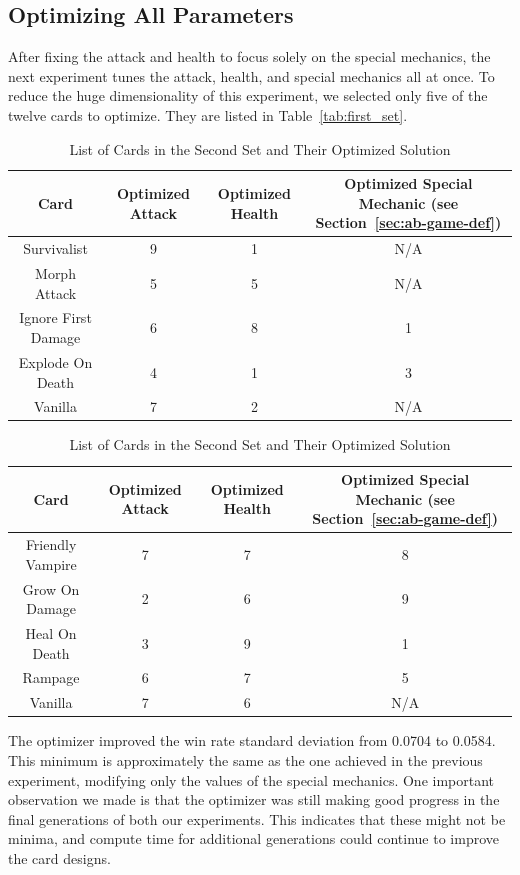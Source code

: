 \documentclass[letterpaper]{article} %
\begin{document}
\subsection{Optimizing All Parameters} \label{sec:first_set}

After fixing the attack and health to focus solely on the special mechanics, the next experiment tunes the attack, health, and special mechanics all at once. To reduce the huge dimensionality of this experiment, we selected only five of the twelve cards to optimize. They are listed in Table~\ref{tab:first_set}.

\begin{table}[t]
\centering
\caption{List of Cards in the First Set and Their Optimized Solution}
\label{tab:first_set}
\begin{tabular}{||c c c c||} 
 \hline
 Card & Optimized Attack & Optimized Health & Optimized Special Mechanic (see Section~\ref{sec:ab-game-def})\\ [0.5ex]
 \hline\hline
 Survivalist & 9 & 1 & N/A \\
 \hline
 Morph Attack & 5 & 5 & N/A \\
 \hline
 Ignore First Damage & 6 & 8 & 1 \\
 \hline
 Explode On Death & 4 & 1 & 3 \\ 
 \hline
 Vanilla & 7 & 2 & N/A \\
 \hline
\end{tabular}

\caption{List of Cards in the Second Set and Their Optimized Solution}
\label{tab:second_set}
\begin{tabular}{||c c c c||} 
 \hline
 Card & Optimized Attack & Optimized Health & Optimized Special Mechanic (see Section~\ref{sec:ab-game-def})\\ [0.5ex]
 \hline\hline
 Friendly Vampire & 7 & 7 & 8 \\
 \hline
 Grow On Damage & 2 & 6 & 9 \\
 \hline
 Heal On Death & 3 & 9 & 1 \\
 \hline
 Rampage & 6 & 7 & 5 \\ 
 \hline
 Vanilla & 7 & 6 & N/A \\
 \hline
\end{tabular}
\end{table}


The optimizer improved the win rate standard deviation from 0.0704 to 0.0584. This minimum is approximately the same as the one achieved in the previous experiment, modifying only the values of the special mechanics. One important observation we made is that the optimizer was still making good progress in the final generations of both our experiments. This indicates that these might not be minima, %
and compute time for additional generations could continue to improve the card designs.
\end{document}
